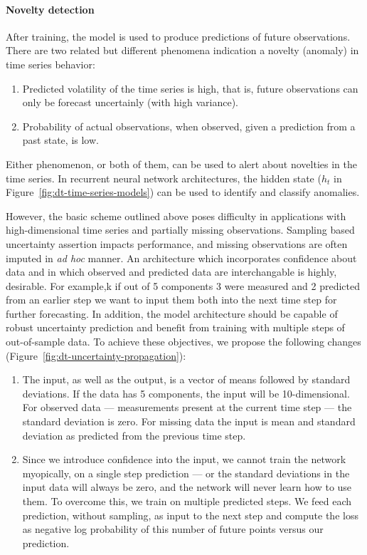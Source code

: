 \documentclass[runningheads]{llncs}
\begin{document}
\paragraph{Novelty detection} After training, the model is used to produce
predictions of future observations. There are two related but different
phenomena indication a novelty (anomaly) in time series behavior:
\begin{enumerate}
\item Predicted volatility of the time series is high, that is, future
observations can only be forecast uncertainly (with high variance). 
\item Probability of actual observations, when observed, given a prediction
from a past state, is low.
\end{enumerate}

Either phenomenon, or both of them, can be used to alert about novelties in the
time series. In recurrent neural network architectures, the hidden state ($h_t$
in Figure~\ref{fig:dt-time-series-models}) can be used to identify and classify
anomalies.

However, the basic scheme outlined above poses difficulty in applications with
high-dimensional time series and partially missing observations. Sampling based
uncertainty assertion impacts performance, and missing observations are often
imputed in \textit{ad hoc} manner. An architecture which
incorporates confidence about data and in which observed and
predicted data are interchangable is  highly, desirable. For example,k if out of 5 components 3 were
measured and 2 predicted from an earlier step we want to input
them both into the next time step for further forecasting. In
addition, the model architecture should be capable of robust uncertainty
prediction and benefit from training with multiple steps of out-of-sample data.
To achieve these objectives, we propose the following changes
(Figure~\ref{fig:dt-uncertainty-propagation}):

\begin{enumerate}
\item The input, as well as the output, is a vector of means followed
by standard deviations. If the data has 5 components, the input
will be 10-dimensional. For observed data --- measurements
present at the current time step --- the standard deviation is
zero. For missing data the input is mean and standard deviation
as predicted from the previous time step.

\item Since we introduce confidence into the input, we cannot train
the network myopically, on a single step prediction --- or the
standard deviations in the input data will always be zero, and
the network will never learn how to use them. To overcome this,
we train on multiple predicted steps. We feed each prediction,
without sampling, as input to the next step and compute the loss
as negative log probability of this number of future points versus our prediction.
\end{enumerate}
\end{document}
